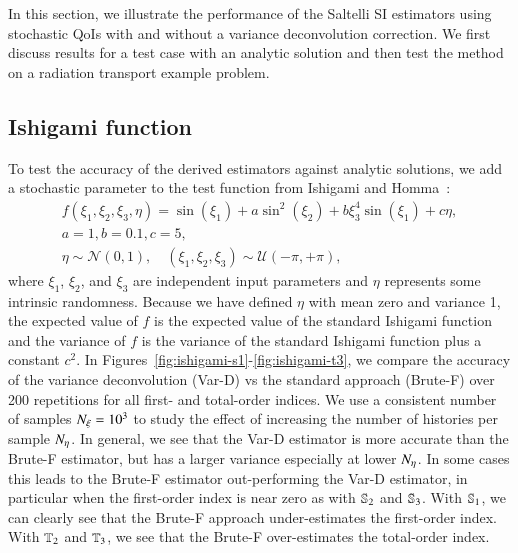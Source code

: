 In this section, we illustrate the performance of the Saltelli SI estimators using stochastic QoIs with and without a variance deconvolution correction. 
We first discuss results for a test case with an analytic solution and then test the method on a radiation transport example problem.

\subsection{Ishigami function}
To test the accuracy of the derived estimators against analytic solutions, we add a stochastic parameter to the test function from Ishigami and Homma~\cite{ishigami-homma-1990}:
\begin{gather} \label{m2eq:stoch-ishigami}
    f \left( \xi_1, \xi_2, \xi_3, \eta \right) = \sin \left( \xi_1 \right) + a \sin^2 \left( \xi_2 \right) + b \xi_3^4 \sin \left( \xi_1 \right) + c\eta, \\
    a=1, b=0.1, c=5, \nonumber \\
    \eta \sim \mathcal{N} \left(0,1\right), \quad (\xi_1, \xi_2, \xi_3) \sim \mathcal{U} \left( -\pi,+\pi\right) , \nonumber
\end{gather}
where $\xi_1$, $\xi_2$, and $\xi_3$ are independent input parameters and $\eta$ represents some intrinsic randomness. 
Because we have defined $\eta$ with mean zero and variance 1, the expected value of $f$ is the expected value of the standard Ishigami function and the variance of $f$ is the variance of the standard Ishigami function plus a constant $c^2$. 
In Figures~\ref{fig:ishigami-s1}-\ref{fig:ishigami-t3}, we compare the accuracy of the variance deconvolution (Var-D) vs the standard approach (Brute-F) over 200 repetitions for all first- and total-order indices. 
We use a consistent number of samples $\Nxi = 10^3$ to study the effect of increasing the number of histories per sample $\Neta$.
In general, we see that the Var-D estimator is more accurate than the Brute-F estimator, but has a larger variance especially at lower $\Neta$. 
In some cases this leads to the Brute-F estimator out-performing the Var-D estimator, in particular when the first-order index is near zero as with $\S{2}$ and $\S{3}$.
With $\S{1}$, we can clearly see that the Brute-F approach under-estimates the first-order index. With $\T{2}$ and $\T{3}$, we see that the Brute-F over-estimates the total-order index.
